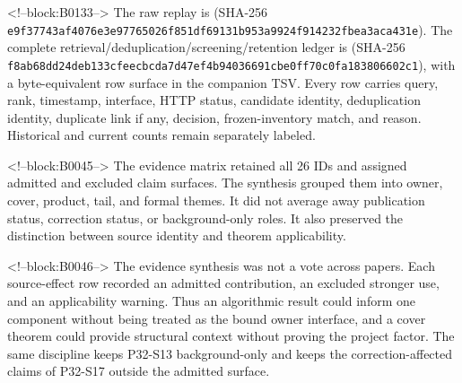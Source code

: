 \documentclass[11pt]{article}
\begin{document}
<!--block:B0133-->
\begingroup\sloppy
The raw replay is
 (SHA-256
\texttt{e9f37743\allowbreak{}af4076e3\allowbreak{}e9776502\allowbreak{}6f851df6\allowbreak{}9131b953\allowbreak{}a9924f91\allowbreak{}4232fbea\allowbreak{}3aca431e}).  The complete retrieval/deduplication/screening/retention
ledger is 
(SHA-256 \texttt{f8ab68dd\allowbreak{}24deb133\allowbreak{}cfeecbcd\allowbreak{}a7d47ef4\allowbreak{}b9403669\allowbreak{}1cbe0ff7\allowbreak{}0c0fa183\allowbreak{}806602c1}), with a byte-equivalent row surface in the companion
TSV.  Every row carries query, rank, timestamp, interface, HTTP status,
candidate identity, deduplication identity, duplicate link if any, decision,
frozen-inventory match, and reason.  Historical and current counts remain
separately labeled.
\par\endgroup

<!--block:B0045-->
The evidence matrix retained all 26 IDs and assigned admitted and
excluded claim surfaces. The synthesis grouped them into owner, cover,
product, tail, and formal themes. It did not average away publication
status, correction status, or background-only roles. It also preserved
the distinction between source identity and theorem applicability.

<!--block:B0046-->
The evidence synthesis was not a vote across papers. Each source-effect
row recorded an admitted contribution, an excluded stronger use, and an
applicability warning. Thus an algorithmic result could inform one
component without being treated as the bound owner interface, and a
cover theorem could provide structural context without proving the
project factor. The same discipline keeps P32-S13 background-only and
keeps the correction-affected claims of P32-S17 outside the admitted
surface.
\end{document}
